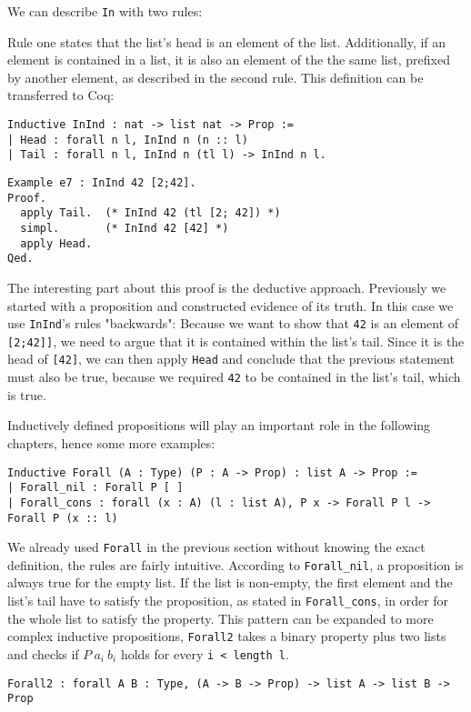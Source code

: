 \documentclass[fleqn]{scrreprt}
\newcommand{\coqinline}[1]{\texttt{#1}}
\begin{document}
\par
We can describe \coqinline{In} with two rules:
\begin{figure}[H]
	\begin{center}
		\begin{minipage}{.45 \linewidth}
			\infer[1]{\coqinline{In n (n :: l)}}{\phantom{premise}}
		\end{minipage}
		\hspace{.1 \linewidth}
		\begin{minipage}{.45 \linewidth}
			\infer[2]{\coqinline{In n (e :: l)}}{\coqinline{In n l}}
		\end{minipage}
	\end{center}
	\vspace*{-1em}
\end{figure}
Rule one states that the list's head is an element of the list. Additionally, if an element is contained in a list, it is also an element of the the same list, prefixed by another element, as described in the second rule. This definition can be transferred to Coq:
\begin{verbatim}
Inductive InInd : nat -> list nat -> Prop :=
| Head : forall n l, InInd n (n :: l)
| Tail : forall n l, InInd n (tl l) -> InInd n l.
\end{verbatim}
\begin{verbatim}
Example e7 : InInd 42 [2;42].
Proof. 
  apply Tail.  (* InInd 42 (tl [2; 42]) *)
  simpl.       (* InInd 42 [42] *)
  apply Head.
Qed.           
\end{verbatim}
The interesting part about this proof is the deductive approach. Previously we started with a proposition and constructed evidence of its truth. In this case we use \coqinline{InInd}'s rules "backwards": Because we want to show that \coqinline{42} is an element of \coqinline{[2;42]]}, we need to argue that it is contained within the list's tail. Since it is the head of \coqinline{[42]}, we can then apply \coqinline{Head} and conclude that the previous statement must also be true, because we required \coqinline{42} to be contained in the list's tail, which is true.
\par
Inductively defined propositions will play an important role in the following chapters, hence some more examples:
\begin{verbatim}
Inductive Forall (A : Type) (P : A -> Prop) : list A -> Prop :=
| Forall_nil : Forall P [ ]
| Forall_cons : forall (x : A) (l : list A), P x -> Forall P l -> Forall P (x :: l)
\end{verbatim}
We already used \coqinline{Forall} in the previous section without knowing the exact definition, the rules are fairly intuitive. According to \coqinline{Forall_nil}, a proposition is always true for the empty list. If the list is non-empty, the first element and the list's tail have to satisfy the proposition, as stated in \coqinline{Forall_cons}, in order for the whole list to satisfy the property. This pattern can be expanded to more complex inductive propositions, \coqinline{Forall2} takes a binary property plus two lists and checks if $P ~ a_{i} ~ b_{i}$ holds for every \coqinline{i < length l}.
\begin{verbatim}
Forall2 : forall A B : Type, (A -> B -> Prop) -> list A -> list B -> Prop
\end{verbatim}
\end{document}
